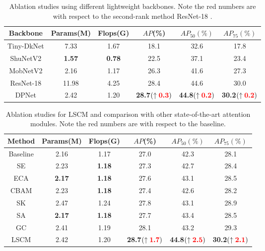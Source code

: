 \documentclass[lettersize,journal]{IEEEtran}
\begin{document}
\begin{table}[t!] 
	\tabcolsep 0.3mm \caption{Ablation studies using different lightweight backbones. Note the red numbers are with respect to the second-rank method ResNet-18 \cite{resnet}.}
	\begin{center}
		\begin{tabular}{c|c|c|c|c|c}
			\toprule \multirow{1}{*}{Backbone} &\multirow{1}{*}{Params(M)}  & \multirow{1}{*}{Flops(G)}& \multirow{1}{*}{$AP$(\%)}& \multirow{1}{*}{$AP_{50}(\%)$}& \multirow{1}{*}{$AP_{75}(\%)$}\\ \midrule			
			Tiny-DkNet \cite{redmon2018yolov3} &7.33 &1.67 &18.1 &32.6 &17.8   \\		
			ShuNetV2 \cite{ma2018shufflenet} &\textbf{1.57} &\textbf{0.78} &22.5 &37.1 &23.4 \\
			MobNetV2 \cite{sandler2018mobilenetv2} &2.16 &1.17 &26.3 &41.6 &27.3 \\
			ResNet-18 \cite{resnet} &11.98 &4.25 &28.4 &44.6 &30.0 \\
\midrule
			DPNet  &2.42 &1.20 &\textbf{28.7}$(\uparrow\textcolor{red}{\textbf{0.3}})$ &\textbf{44.8}$(\uparrow\textcolor{red}{\textbf{0.2}})$ &\textbf{30.2}$(\uparrow\textcolor{red}{\textbf{0.2}})$\\
\bottomrule
		\end{tabular}
	\end{center}\label{tab:backbone}
\end{table}

\begin{table}[t!] 
	\tabcolsep 0.8mm \caption{Ablation studies for LSCM and comparison with other state-of-the-art attention modules. Note the red numbers are with respect to the baseline.}
	\begin{center}
		\begin{tabular}{c|c|c|c|c|c}
			\toprule \multirow{1}{*}{Method} &\multirow{1}{*}{Params(M)}  & \multirow{1}{*}{Flops(G)}& \multirow{1}{*}{$AP$(\%)}& \multirow{1}{*}{$AP_{50}(\%)$}& \multirow{1}{*}{$AP_{75}(\%)$}\\ \midrule
Baseline &2.16 &1.17&27.0&42.3&28.1 \\
\midrule
			SE \cite{hu2018squeeze} &2.23 &\textbf{1.18}&27.3&42.7&28.4 \\
			ECA \cite{ecanet} &\textbf{2.17} &\textbf{1.18}& 27.6&43.1& 28.5 \\
CBAM \cite{woo2018cbam} &2.23 &\textbf{1.18}&27.4&42.6&28.2\\
			SK \cite{li2019selective} &2.47 &1.24&27.8&43.1&28.9\\
			SA  \cite{zhang2021sa}    &\textbf{2.17} &\textbf{1.18}&27.7&43.4&  28.5   \\
			GC \cite{cao2019gcnet} &2.41 &1.19&28.1&43.2&29.3 \\
\midrule
			LSCM  &2.42 &1.20 &\textbf{28.7}$(\uparrow\textcolor{red}{\textbf{1.7}})$ &\textbf{44.8}$(\uparrow\textcolor{red}{\textbf{2.5}})$ &\textbf{30.2}$(\uparrow\textcolor{red}{\textbf{2.1}})$\\
\bottomrule
		\end{tabular}
	\end{center}\label{tab:ASU}
\end{table}
\end{document}
